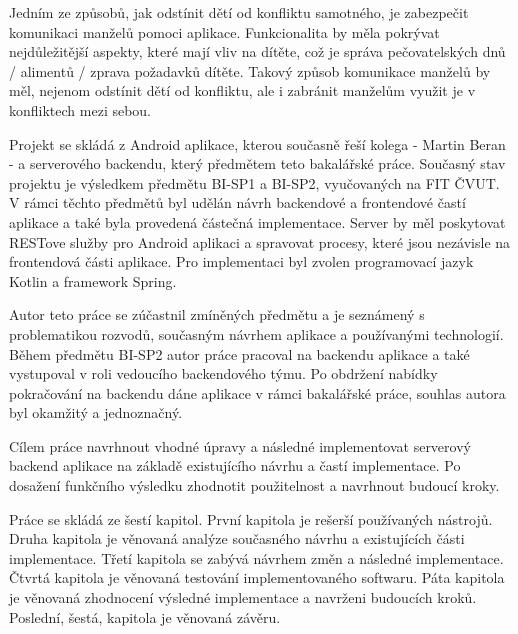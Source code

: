 Jedním ze způsobů, jak odstínit dětí od konfliktu samotného, je zabezpečit komunikaci manželů pomoci aplikace. Funkcionalita by měla pokrývat nejdůležitější aspekty, které mají vliv na dítěte, což je správa pečovatelských dnů / alimentů / zprava požadavků dítěte. Takový způsob komunikace manželů by měl, nejenom odstínit dětí od konfliktu, ale i zabránit manželům využit je v konfliktech mezi sebou.

Projekt se skládá z Android aplikace, kterou současně řeší kolega - Martin Beran - a serverového backendu, který předmětem teto bakalářské práce. Současný stav projektu je výsledkem předmětu BI-SP1 a BI-SP2, vyučovaných na FIT ČVUT. V rámci těchto předmětů byl udělán návrh backendové a frontendové častí aplikace a také byla provedená částečná implementace. Server by měl poskytovat RESTove služby pro Android aplikaci a spravovat procesy, které jsou nezávisle na frontendová části aplikace. Pro implementaci byl zvolen programovací jazyk Kotlin a framework Spring.

Autor teto práce se zúčastnil zmíněných předmětu a je seznámený s problematikou rozvodů, současným návrhem aplikace a používanými technologií. Během předmětu BI-SP2 autor práce pracoval na backendu aplikace a také vystupoval v roli vedoucího backendového týmu. Po obdržení nabídky pokračování na backendu dáne aplikace v rámci bakalářské práce, souhlas autora byl okamžitý a jednoznačný.

Cílem práce navrhnout vhodné úpravy a následné implementovat serverový backend aplikace na základě existujícího návrhu a častí implementace. Po dosažení funkčního výsledku zhodnotit použitelnost a navrhnout budoucí kroky.

Práce se skládá ze šestí kapitol. První kapitola je rešerší používaných nástrojů. Druha kapitola je věnovaná analýze současného návrhu a existujících části implementace. Třetí kapitola se zabývá návrhem změn a následné implementace. Čtvrtá kapitola je věnovaná testování implementovaného softwaru. Páta kapitola je věnovaná zhodnocení výsledné implementace a navrženi budoucích kroků. Poslední, šestá, kapitola je věnovaná závěru.






